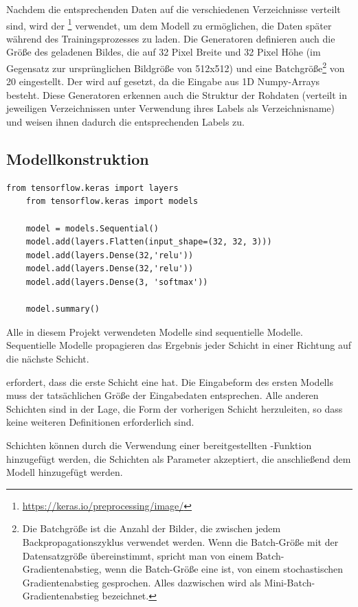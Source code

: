 Nachdem die entsprechenden Daten auf die verschiedenen Verzeichnisse verteilt sind, wird der \footnote{\url{https://keras.io/preprocessing/image/}} verwendet, um dem Modell zu ermöglichen, die Daten später während des Trainingsprozesses zu laden.
Die Generatoren definieren auch die Größe des geladenen Bildes, die auf 32 Pixel Breite und 32 Pixel Höhe (im Gegensatz zur ursprünglichen Bildgröße von 512x512) und eine Batchgröße\footnote{Die Batchgröße ist die Anzahl der Bilder, die zwischen jedem Backpropagationszyklus verwendet werden.
Wenn die Batch-Größe mit der Datensatzgröße übereinstimmt, spricht man von einem Batch-Gradientenabstieg, wenn die Batch-Größe eine ist, von einem stochastischen Gradientenabstieg gesprochen.
Alles dazwischen wird als Mini-Batch-Gradientenabstieg bezeichnet.} von 20 eingestellt.
Der  wird auf  gesetzt, da die Eingabe aus 1D Numpy-Arrays besteht.
Diese Generatoren erkennen auch die Struktur der Rohdaten (verteilt in jeweiligen Verzeichnissen unter Verwendung ihres Labels als Verzeichnisname) und weisen ihnen dadurch die entsprechenden Labels zu.

\subsection{Modellkonstruktion}

\begin{lstlisting}[label={lst:first_model}]
    from tensorflow.keras import layers
    from tensorflow.keras import models
    
    model = models.Sequential()
    model.add(layers.Flatten(input_shape=(32, 32, 3)))
    model.add(layers.Dense(32,'relu'))
    model.add(layers.Dense(32,'relu'))
    model.add(layers.Dense(3, 'softmax'))
    
    model.summary()
\end{lstlisting}

Alle in diesem Projekt verwendeten Modelle sind sequentielle Modelle.
Sequentielle Modelle propagieren das Ergebnis jeder Schicht in einer Richtung auf die nächste Schicht.

 erfordert, dass die erste Schicht eine  hat.
Die Eingabeform des ersten Modells muss der tatsächlichen Größe der Eingabedaten entsprechen.
Alle anderen Schichten sind in der Lage, die Form der vorherigen Schicht herzuleiten, so dass keine weiteren Definitionen erforderlich sind.

Schichten können durch die Verwendung einer bereitgestellten -Funktion hinzugefügt werden, die Schichten als Parameter akzeptiert, die anschließend dem Modell hinzugefügt werden.

